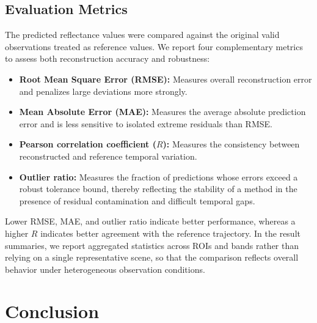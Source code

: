 \documentclass[letterpaper,journal]{IEEEtran}
\begin{document}
\subsection{Evaluation Metrics}
The predicted reflectance values were compared against the original valid observations treated as reference values. We report four complementary metrics to assess both reconstruction accuracy and robustness:
\begin{itemize}
    \item \textbf{Root Mean Square Error (RMSE):} Measures overall reconstruction error and penalizes large deviations more strongly.
    \item \textbf{Mean Absolute Error (MAE):} Measures the average absolute prediction error and is less sensitive to isolated extreme residuals than RMSE.
    \item \textbf{Pearson correlation coefficient ($R$):} Measures the consistency between reconstructed and reference temporal variation.
    \item \textbf{Outlier ratio:} Measures the fraction of predictions whose errors exceed a robust tolerance bound, thereby reflecting the stability of a method in the presence of residual contamination and difficult temporal gaps.
\end{itemize}

Lower RMSE, MAE, and outlier ratio indicate better performance, whereas a higher $R$ indicates better agreement with the reference trajectory. In the result summaries, we report aggregated statistics across ROIs and bands rather than relying on a single representative scene, so that the comparison reflects overall behavior under heterogeneous observation conditions.

\section{Conclusion}
\end{document}
